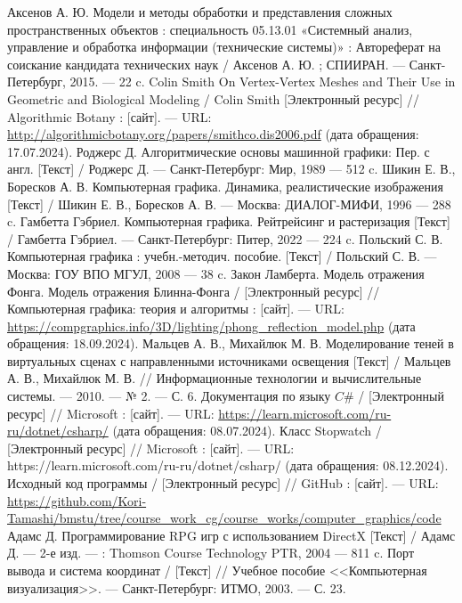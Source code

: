 \begin{thebibliography}{}
	 Аксенов А. Ю. Модели и методы обработки и представления сложных пространственных объектов : специальность 05.13.01 «Системный анализ, управление и обработка  информации (технические системы)» : Автореферат на соискание кандидата технических наук / Аксенов А. Ю. ; СПИИРАН. — Санкт-Петербург, 2015. — 22 c.
	 Colin Smith On Vertex-Vertex Meshes and Their Use in Geometric and Biological Modeling / Colin Smith [Электронный ресурс] // Algorithmic Botany : [сайт]. — URL: \url{http://algorithmicbotany.org/papers/smithco.dis2006.pdf} (дата обращения: 17.07.2024).
	 Роджерс Д. Алгоритмические основы машинной графики: Пер. с англ. [Текст] / Роджерс Д. — Санкт-Петербург: Мир, 1989 — 512 c.
	 Шикин Е. В., Боресков А. В. Компьютерная графика. Динамика, реалистические изображения [Текст] / Шикин Е. В., Боресков А. В. — Москва: ДИАЛОГ-МИФИ, 1996 — 288 c.
	 Гамбетта Гэбриел. Компьютерная графика. Рейтрейсинг и растеризация [Текст] / Гамбетта Гэбриел. — Санкт-Петербург: Питер, 2022 — 224 c.
	 Польский С. В. Компьютерная графика : учебн.-методич. пособие. [Текст] / Польский С. В. — Москва: ГОУ ВПО МГУЛ, 2008 — 38 c.
	 Закон Ламберта. Модель отражения Фонга. Модель отражения Блинна-Фонга /  [Электронный ресурс] // Компьютерная графика: теория и алгоритмы : [сайт]. — URL: \url{https://compgraphics.info/3D/lighting/phong_reflection_model.php} (дата обращения: 18.09.2024).
	 Мальцев А. В., Михайлюк М. В. Моделирование теней в виртуальных сценах с направленными источниками освещения [Текст] / Мальцев А. В., Михайлюк М. В. // Информационные технологии и вычислительные системы. — 2010. — № 2. — С. 6.
	  Документация по языку $C\#$ /  [Электронный ресурс] // Microsoft : [сайт]. — URL: \url{https://learn.microsoft.com/ru-ru/dotnet/csharp/} (дата обращения: 08.07.2024).
	  Класс Stopwatch /  [Электронный ресурс] // Microsoft : [сайт]. — URL: https://learn.microsoft.com/ru-ru/dotnet/csharp/ (дата обращения: 08.12.2024).
	  Исходный код программы /  [Электронный ресурс] // GitHub : [сайт]. — URL: \url{https://github.com/Kori-Tamashi/bmstu/tree/course_work_cg/course_works/computer_graphics/code}
	 Адамс Д. Программирование RPG игр с использованием DirectX [Текст] / Адамс Д. — 2-е изд. — : Thomson Course Technology PTR, 2004 — 811 c.
	 Порт вывода и система координат / [Текст] // Учебное пособие <<Компьютерная визуализация>>. — Санкт-Петербург: ИТМО, 2003. — С. 23.

\end{thebibliography}
